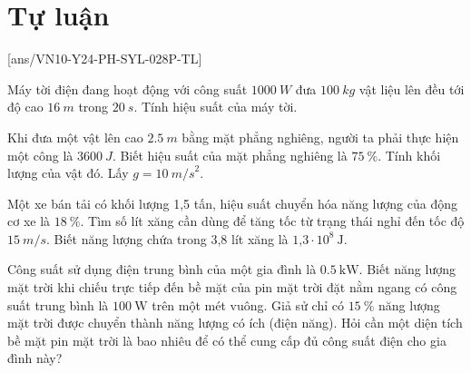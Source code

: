 \section{Tự luận}
\setcounter{ex}{0}
[ans/VN10-Y24-PH-SYL-028P-TL]
\begin{ex}
Máy tời điện đang hoạt động với công suất $\SI{1000}{W}$ đưa $\SI{100}{kg}$ vật liệu lên đều tới độ cao $\SI{16}{m}$ trong $\SI{20}{s}$. Tính hiệu suất của máy tời.	
\end{ex}
\begin{ex}
Khi đưa một vật lên cao $\SI{2,5}{m}$ bằng mặt phẳng nghiêng, người ta phải thực hiện một công là $\SI{3600}{J}$. Biết hiệu suất của mặt phẳng nghiêng là $\SI{75}{\percent}$. Tính khối lượng của vật đó. Lấy $g = \SI{10}{m/s}^2$.	
\end{ex}
\begin{ex}
Một xe bán tải có khối lượng 1,5 tấn, hiệu suất chuyển hóa năng lượng của động cơ xe là $\SI{18}{\percent}$. Tìm số lít xăng cần dùng để tăng tốc từ trạng thái nghỉ đến tốc độ $\SI{15}{m/s}$. Biết năng lượng chứa trong 3,8 lít xăng là $\text{1,3}\cdot10^8\ \text{J}$.	
\end{ex}
\begin{ex}
	Công suất sử dụng điện trung bình của một gia đình là $\SI{0.5}{\kilo\watt}$. Biết năng lượng mặt trời khi chiếu trực tiếp đến bề mặt của pin mặt trời đặt nằm ngang có công suất trung bình là $\SI{100}{\watt}$ trên một mét vuông. Giả sử chỉ có $\SI{15}{\percent}$ năng lượng mặt trời được chuyển thành năng lượng có ích (điện năng). Hỏi cần một diện tích bề mặt pin mặt trời là bao nhiêu để có thể cung cấp đủ công suất điện cho gia đình này?
\end{ex}
